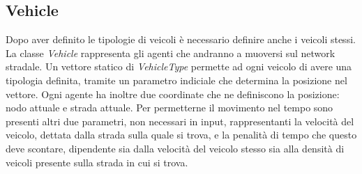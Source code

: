 \documentclass[12pt,a4paper]{report}
\begin{document}
\subsection{Vehicle}
Dopo aver definito le tipologie di veicoli è necessario definire anche i veicoli stessi.
La classe \emph{Vehicle} rappresenta gli agenti che andranno a muoversi sul network stradale.
Un vettore statico di \emph{VehicleType} permette ad ogni veicolo di avere una tipologia definita, tramite un parametro indiciale che determina la posizione nel vettore.
Ogni agente ha inoltre due coordinate che ne definiscono la posizione: nodo attuale e strada attuale.
Per permetterne il movimento nel tempo sono presenti altri due parametri, non necessari in input, rappresentanti la velocità del veicolo, dettata dalla strada sulla quale si trova, e la penalità di tempo che questo deve scontare, dipendente sia dalla velocità del veicolo stesso sia alla densità di veicoli presente sulla strada in cui si trova.
\end{document}
